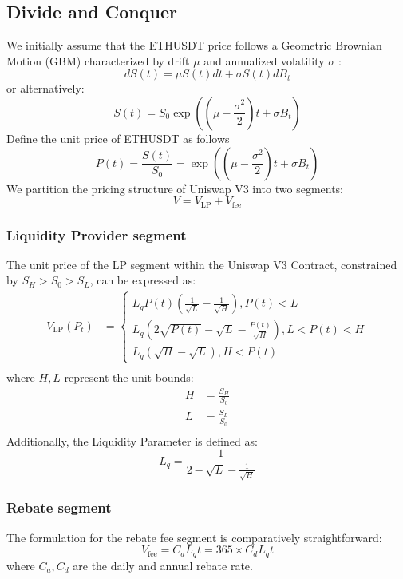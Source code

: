 \documentclass[conference]{IEEEtran}
\begin{document}
\subsection{Divide and Conquer}\label{AA}
We initially assume that the ETHUSDT price follows a Geometric Brownian Motion (GBM) characterized by drift $\mu$ and annualized volatility $\sigma$ :
$$dS(t)=\mu S(t)dt+ \sigma S(t)dB_t$$
or alternatively:
$$
S(t) = S_0\exp((\mu-\frac{\sigma^2}{2})t+\sigma B_t)
$$
Define the unit price of ETHUSDT as follows
$$P(t) = \frac{S(t)}{S_0}=\exp((\mu-\frac{\sigma^2}{2})t+\sigma B_t)$$
We partition the pricing structure of Uniswap V3 into two segments:
$$
V = V_{\text{LP}}+V_{\text{fee}}
$$
\subsubsection{Liquidity Provider segment}
The unit price of the LP segment within the Uniswap V3 Contract, constrained by $S_H>S_0> S_L$, can be expressed as:
$$
\begin{aligned}
V_\text{LP}(P_t)&=
\begin{cases}
L_q P(t)(\frac{1}{\sqrt{L}}-\frac{1}{\sqrt{H}}), P(t)<L \\
L_q(2\sqrt{P(t)}-\sqrt{L}-\frac{P(t)}{\sqrt{H}}), L<P(t)<H \\
L_q(\sqrt{H}-\sqrt{L}), H<P(t)
\end{cases} \\
\end{aligned}
$$
where $H, L$ represent the unit bounds:
$$
\begin{aligned}
H &= \frac{S_H}{S_0}\\
L &= \frac{S_L}{S_0}\\
\end{aligned}
$$
Additionally, the Liquidity Parameter is defined as:
$$
L_q =\frac{1}{2-\sqrt{L}-\frac{1}{\sqrt{H}}}
$$
\subsubsection{Rebate segment}
The formulation for the rebate fee segment is comparatively straightforward:
$$
V_{\text{fee}} = C_a L_q t=365\times C_d L_q t
$$
where $C_a, C_d$ are the daily and annual rebate rate.
\end{document}
